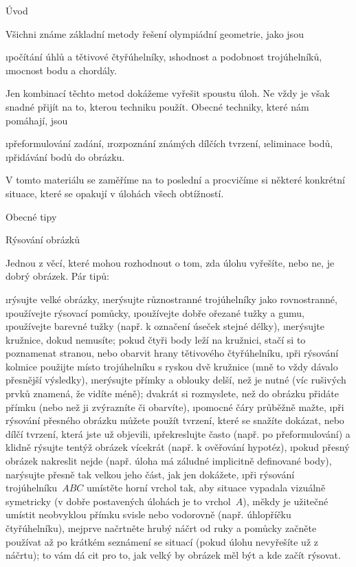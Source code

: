 

\let\angle\sphericalangle





\sec Úvod

Všichni známe základní metody řešení olympiádní geometrie, jako jsou

\begitems
\i počítání úhlů a tětivové čtyřúhelníky,
\i shodnost a podobnost trojúhelníků,
\i mocnost bodu a chordály.
\enditems

Jen kombinací těchto metod dokážeme vyřešit spoustu úloh. Ne vždy je však snadné přijít na to, kterou techniku použít. Obecné techniky, které nám pomáhají, jsou

\begitems
\i přeformulování zadání,
\i rozpoznání známých dílčích tvrzení,
\i eliminace bodů,
\i přidávání bodů do obrázku.
\enditems

V tomto materiálu se zaměříme na to poslední a procvičíme si některé konkrétní situace, které se opakují v úlohách všech obtížností.

\sec Obecné tipy

\secc Rýsování obrázků

Jednou z věcí, které mohou rozhodnout o tom, zda úlohu vyřešíte, nebo ne, je dobrý obrázek. Pár tipů:

\begitems
\i rýsujte velké obrázky,
\i nerýsujte různostranné trojúhelníky jako rovnostranné,
\i používejte rýsovací pomůcky,
\i používejte dobře ořezané tužky a gumu,
\i používejte barevné tužky (např. k označení úseček stejné délky),
\i nerýsujte kružnice, dokud nemusíte; pokud čtyři body leží na kružnici, stačí si to poznamenat stranou, nebo obarvit hrany tětivového čtyřúhelníku,
\i při rýsování kolmice použijte místo trojúhelníku s ryskou dvě kružnice (mně to vždy dávalo přesnější výsledky),
\i nerýsujte přímky a oblouky delší, než je nutné (víc rušivých prvků znamená, že vidíte méně); dvakrát si rozmyslete, než do obrázku přidáte přímku (nebo než ji zvýrazníte či obarvíte),
\i pomocné čáry průběžně mažte,
\i při rýsování přesného obrázku můžete použít tvrzení, které se snažíte dokázat, nebo dílčí tvrzení, která jste už objevili,
\i překreslujte často (např. po přeformulování) a klidně rýsujte tentýž obrázek vícekrát (např. k ověřování hypotéz),
\i pokud přesný obrázek nakreslit nejde (např. úloha má záludné implicitně definované body), narýsujte přesně tak velkou jeho část, jak jen dokážete,
\i při rýsování trojúhelníku~$ABC$ umístěte horní vrchol tak, aby situace vypadala vizuálně symetricky (v dobře postavených úlohách je to vrchol~$A$),
\i někdy je užitečné umístit neobvyklou přímku svisle nebo vodorovně (např. úhlopříčku čtyřúhelníku),
\i nejprve načrtněte hrubý náčrt od ruky a pomůcky začněte používat až po krátkém seznámení se situací (pokud úlohu nevyřešíte už z náčrtu); to vám dá cit pro to, jak velký by obrázek měl být a kde začít rýsovat.
\enditems

